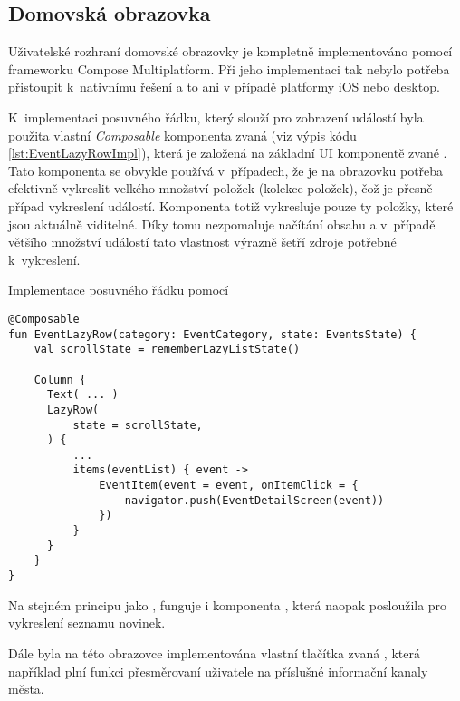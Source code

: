 \subsection{Domovská obrazovka}
Uživatelské rozhraní domovské obrazovky je kompletně implementováno pomocí frameworku Compose Multiplatform. Při jeho implementaci tak nebylo potřeba
přistoupit k~nativnímu řešení a to ani v případě platformy iOS nebo desktop.

K~implementaci posuvného řádku, který slouží pro zobrazení událostí byla použita vlastní \textit{Composable} komponenta zvaná  
(viz výpis kódu \ref{lst:EventLazyRowImpl}),
která je založená na základní UI komponentě zvané . Tato komponenta se obvykle používá v~případech, že je na obrazovku potřeba efektivně 
vykreslit velkého množství položek (kolekce položek), čož je přesně případ vykreslení událostí. Komponenta  totiž vykresluje pouze ty položky,
které jsou aktuálně viditelné. Díky tomu nezpomaluje načítání obsahu a v~případě většího množství událostí tato vlastnost výrazně šetří zdroje potřebné k~vykreslení.

\begin{listing}[H]
\caption{Implementace posuvného řádku pomocí }\label{lst:EventLazyRowImpl}
\begin{verbatim}
@Composable
fun EventLazyRow(category: EventCategory, state: EventsState) {
    val scrollState = rememberLazyListState()

    Column {
      Text( ... )
      LazyRow(
          state = scrollState,
      ) {
          ...
          items(eventList) { event ->
              EventItem(event = event, onItemClick = {
                  navigator.push(EventDetailScreen(event))
              })
          }
      }
    }
}  
\end{verbatim}
\end{listing}

Na stejném principu jako , funguje i komponenta , která naopak posloužila pro vykreslení seznamu novinek.

Dále byla na této obrazovce implementována vlastní tlačítka zvaná , která například plní funkci přesměrovaní uživatele na 
příslušné informační kanaly města.  



